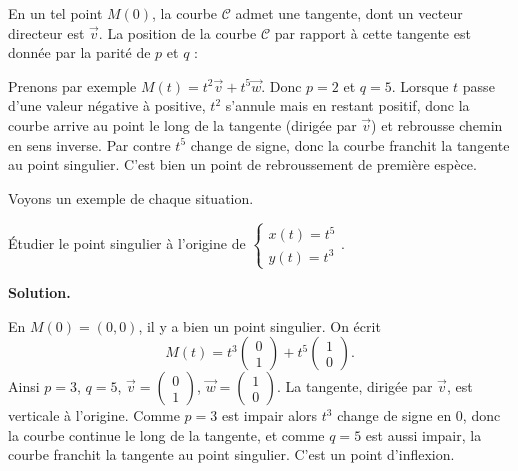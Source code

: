 \documentclass[class=report,crop=false]{standalone}
\begin{document}
En un tel point $M(0)$, la courbe $\mathcal{C}$ admet une tangente, dont un vecteur directeur est
$\vec{v}$. La position de la courbe $\mathcal{C}$ par rapport à cette tangente
est donnée par la parité de $p$ et $q$ :


Prenons par exemple $M(t) = t^2 \vec{v} + t^5 \vec{w}$.
Donc $p=2$ et $q=5$.
Lorsque $t$ passe d'une valeur négative à positive,
$t^2$ s'annule mais en restant positif,
donc la courbe arrive au point le long de la tangente (dirigée par $\vec{v}$)
et rebrousse chemin en sens inverse.
Par contre $t^5$ change de signe, donc la courbe franchit la tangente au point singulier.
C'est bien un point de rebroussement de première espèce.

\bigskip


Voyons un exemple de chaque situation.

\begin{exemple}
Étudier le point singulier à l'origine de
$\left\{\begin{array}{l} x(t) = t^5\\ y(t) = t^3\end{array}\right..$

\medskip
\textbf{Solution.}

En $M(0)=(0,0)$, il y a bien un point singulier.
On écrit
$$M(t) = t^3 \begin{pmatrix}0\\1\end{pmatrix} + t^5
\begin{pmatrix}1\\0\end{pmatrix}.$$
Ainsi $p=3$, $q=5$,
$\vec{v}=\left(\begin{smallmatrix}0\\1\end{smallmatrix}\right)$,
$\vec{w}=\left(\begin{smallmatrix}1\\0\end{smallmatrix}\right)$.
La tangente, dirigée par $\vec{v}$, est verticale à l'origine.
Comme $p=3$ est impair alors $t^3$ change de signe en $0$,
donc la courbe continue le long de la tangente, et comme $q=5$ est aussi
impair, la courbe franchit la tangente au point singulier.
C'est un point d'inflexion.



\end{exemple}
\end{document}
